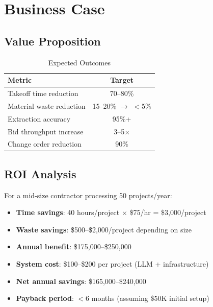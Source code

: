 
\section{Business Case}

\subsection{Value Proposition}

\begin{table}[ht]
\centering
\caption{Expected Outcomes}
\label{tab:outcomes}
\begin{tabular}{lc}
\toprule
\textbf{Metric} & \textbf{Target} \\
\midrule
Takeoff time reduction & 70--80\% \\
Material waste reduction & 15--20\% $\rightarrow$ $<$5\% \\
Extraction accuracy & 95\%+ \\
Bid throughput increase & 3--5$\times$ \\
Change order reduction & 90\% \\
\bottomrule
\end{tabular}
\end{table}

\subsection{ROI Analysis}

For a mid-size contractor processing 50 projects/year:
\begin{itemize}
  \item \textbf{Time savings}: 40 hours/project $\times$ \$75/hr = \$3,000/project
  \item \textbf{Waste savings}: \$500--\$2,000/project depending on size
  \item \textbf{Annual benefit}: \$175,000--\$250,000
  \item \textbf{System cost}: \$100--\$200 per project (LLM + infrastructure)
  \item \textbf{Net annual savings}: \$165,000--\$240,000
  \item \textbf{Payback period}: $<$6 months (assuming \$50K initial setup)
\end{itemize}

